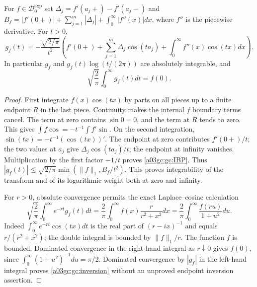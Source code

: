 \begin{lemma}
For $f\in\mathcal D_0^{\exp}$ set
$\Delta_j=f'(a_j+)-f'(a_j-)$ and
$B_f=|f'(0+)|+\sum_{j=1}^m|\Delta_j|+\int_0^\infty|f''(x)|dx$,
where $f''$ is the piecewise derivative.  For $t>0$,
\begin{equation}
 g_f(t)=-\frac{\sqrt{2/\pi}}{t^2}
 \left(f'(0+)+\sum_{j=1}^m\Delta_j\cos(ta_j)
                   +\int_0^\infty f''(x)\cos(tx)dx\right).
 \label{a03gc:gc:IBP}
\end{equation}
In particular $g_f$ and $g_f(t)\log(t/(2\pi))$ are absolutely integrable,
and
\begin{equation}
 \sqrt{\frac2\pi}\int_0^\infty g_f(t)dt=f(0).
 \label{a03gc:gc:inversion}
\end{equation}
\end{lemma}
\begin{proof}
First integrate $f(x)\cos(tx)$ by parts on all pieces up to a finite
endpoint $R$ in the last piece.  Continuity makes the internal $f$
boundary terms cancel.  The term at zero contains $\sin0=0$, and the
term at $R$ tends to zero.  This gives
$\int f\cos=-t^{-1}\int f'\sin$.
On the second integration, $\sin(tx)=-t^{-1}(\cos(tx))'$.
The endpoint at zero contributes $f'(0+)/t$; the two values at $a_j$
give $\Delta_j\cos(ta_j)/t$; the endpoint at infinity vanishes.
Multiplication by the first factor $-1/t$ proves \eqref{a03gc:gc:IBP}.
Thus
$|g_f(t)|\le\sqrt{2/\pi}\min(\|f\|_1,B_f/t^2)$.
This proves integrability of the transform and of its logarithmic weight
both at zero and infinity.

For $r>0$, absolute convergence permits the exact Laplace--cosine
calculation
\begin{equation}
 \sqrt{\frac2\pi}\int_0^\infty e^{-rt}g_f(t)dt
  =\frac2\pi\int_0^\infty f(x)\frac{r}{r^2+x^2}dx
  =\frac2\pi\int_0^\infty\frac{f(ru)}{1+u^2}du.
 \label{a03gc:gc:Poisson}
\end{equation}
Indeed $\int_0^\infty e^{-rt}\cos(tx)dt$
is the real part of $(r-ix)^{-1}$ and equals $r/(r^2+x^2)$;
the double integral is bounded by $\|f\|_1/r$.
The function $f$ is bounded.  Dominated convergence in the right-hand
integral as $r\downarrow0$ gives $f(0)$, since
$\int_0^\infty(1+u^2)^{-1}du=\pi/2$.
Dominated convergence by $|g_f|$ in the left-hand integral proves
\eqref{a03gc:gc:inversion} without an unproved endpoint inversion assertion.
\end{proof}

